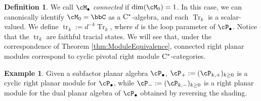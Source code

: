 \documentclass[11pt]{article}
\theoremstyle{plain}
\theoremstyle{definition}
\newtheorem{defn}[thm]{Definition}
\newtheorem{ex}[thm]{Example}
\DeclareMathOperator{\Tr}{Tr}
\DeclareMathOperator{\tr}{tr}
\newcommand{\Cstar}{\rm{C^*}}
\begin{document}
\begin{defn}
We call $\cM_\bullet$ \emph{connected} if $\dim(\cM_0) = 1$.
In this case, we can canonically identify $\cM_0 = \bbC$ as a $\Cstar$-algebra, and each $\Tr_k$ is a scalar-valued.
We define $\tr_k := d^{-k} \Tr_k$, where $d$ is the loop parameter of $\cP_\bullet$.
Notice that the $\tr_k$ are faithful tracial states.
We will see that, under the correspondence of Theorem \ref{thm:ModuleEquivalence}, connected right planar modules correspond to cyclic pivotal right module $\Cstar$-categories.
\end{defn}

\begin{ex}
 Given a subfactor planar algebra $\cP_\bullet$, $\cP_+ :=( \cP_{k,+})_{k\geq 0}$ is a cyclic right planar module for $\cP_\bullet$, while $\cP_- :=( \cP_{k,-})_{k\geq 0}$ is a right planar module for the dual planar algebra of $\cP_{\bullet}$ obtained by reversing the shading. 
\end{ex}
\end{document}
